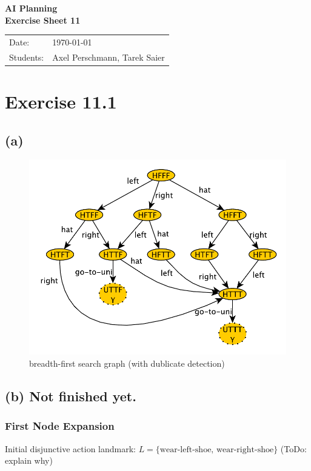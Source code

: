 \documentclass[11pt,a4paper]{article}
\newcommand{\sheetNr}{11}
\begin{document}
\begin{center}
\Huge{\textbf{AI Planning}}\\
\LARGE{\textbf{Exercise Sheet \sheetNr}}
\end{center}
\vspace{2cm}
\begin{tabular}{ll}
Date: & \today\\
Students: & Axel Perschmann, Tarek Saier
\end{tabular}

\section*{Exercise 11.1}
\subsection*{(a)}
\begin{figure}[h!]
\centering
\includegraphics[scale=0.7]{breadthFirstBasic}
\caption{breadth-first search graph (with dublicate detection)}
\end{figure}

\subsection*{(b) Not finished yet.}
\subsubsection*{First Node Expansion}
Initial disjunctive action landmark: $L = \{\text{wear-left-shoe, wear-right-shoe}\}$ (ToDo: explain why)
\end{document}
